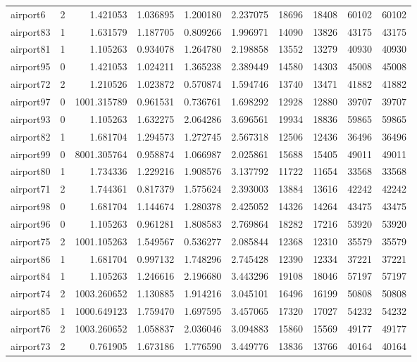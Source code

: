 \begin{longtable}{|l|r|r|r|r|r|r|r|r|r|}
airport6 & 2 & 1.421053 & 1.036895 & 1.200180 & 2.237075 & 18696 & 18408 & 60102 & 60102 \\
airport83 & 1 & 1.631579 & 1.187705 & 0.809266 & 1.996971 & 14090 & 13826 & 43175 & 43175 \\
airport81 & 1 & 1.105263 & 0.934078 & 1.264780 & 2.198858 & 13552 & 13279 & 40930 & 40930 \\
airport95 & 0 & 1.421053 & 1.024211 & 1.365238 & 2.389449 & 14580 & 14303 & 45008 & 45008 \\
airport72 & 2 & 1.210526 & 1.023872 & 0.570874 & 1.594746 & 13740 & 13471 & 41882 & 41882 \\
airport97 & 0 & 1001.315789 & 0.961531 & 0.736761 & 1.698292 & 12928 & 12880 & 39707 & 39707 \\
airport93 & 0 & 1.105263 & 1.632275 & 2.064286 & 3.696561 & 19934 & 18836 & 59865 & 59865 \\
airport82 & 1 & 1.681704 & 1.294573 & 1.272745 & 2.567318 & 12506 & 12436 & 36496 & 36496 \\
airport99 & 0 & 8001.305764 & 0.958874 & 1.066987 & 2.025861 & 15688 & 15405 & 49011 & 49011 \\
airport80 & 1 & 1.734336 & 1.229216 & 1.908576 & 3.137792 & 11722 & 11654 & 33568 & 33568 \\
airport71 & 2 & 1.744361 & 0.817379 & 1.575624 & 2.393003 & 13884 & 13616 & 42242 & 42242 \\
airport98 & 0 & 1.681704 & 1.144674 & 1.280378 & 2.425052 & 14326 & 14264 & 43475 & 43475 \\
airport96 & 0 & 1.105263 & 0.961281 & 1.808583 & 2.769864 & 18282 & 17216 & 53920 & 53920 \\
airport75 & 2 & 1001.105263 & 1.549567 & 0.536277 & 2.085844 & 12368 & 12310 & 35579 & 35579 \\
airport86 & 1 & 1.681704 & 0.997132 & 1.748296 & 2.745428 & 12390 & 12334 & 37221 & 37221 \\
airport84 & 1 & 1.105263 & 1.246616 & 2.196680 & 3.443296 & 19108 & 18046 & 57197 & 57197 \\
airport74 & 2 & 1003.260652 & 1.130885 & 1.914216 & 3.045101 & 16496 & 16199 & 50808 & 50808 \\
airport85 & 1 & 1000.649123 & 1.759470 & 1.697595 & 3.457065 & 17320 & 17027 & 54232 & 54232 \\
airport76 & 2 & 1003.260652 & 1.058837 & 2.036046 & 3.094883 & 15860 & 15569 & 49177 & 49177 \\
airport73 & 2 & 0.761905 & 1.673186 & 1.776590 & 3.449776 & 13836 & 13766 & 40164 & 40164 \\

\end{longtable}
